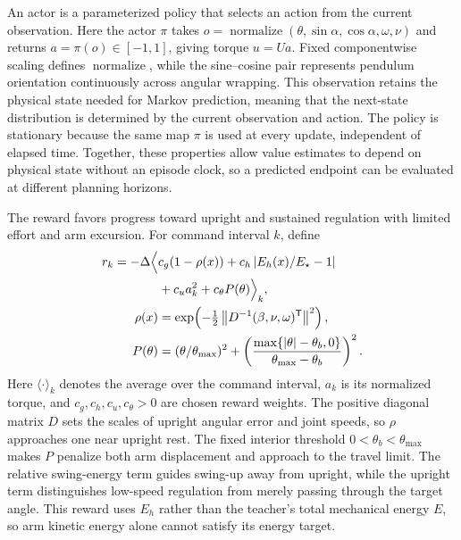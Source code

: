 \documentclass[letterpaper,10pt,conference]{ieeeconf}
\newcommand{\Estar}{E_{\star}}
\begin{document}
An actor is a parameterized policy that selects an action from the current observation. Here the actor $\pi$ takes $o=\operatorname{normalize}(\theta,\sin\alpha,\cos\alpha,\omega,\nu)$ and returns $a=\pi(o)\in[-1,1]$, giving torque $u=Ua$. Fixed componentwise scaling defines $\operatorname{normalize}$, while the sine--cosine pair represents pendulum orientation continuously across angular wrapping. This observation retains the physical state needed for Markov prediction, meaning that the next-state distribution is determined by the current observation and action. The policy is stationary because the same map $\pi$ is used at every update, independent of elapsed time. Together, these properties allow value estimates to depend on physical state without an episode clock, so a predicted endpoint can be evaluated at different planning horizons.

The reward favors progress toward upright and sustained regulation with limited effort and arm excursion. For command interval $k$, define
\begin{equation}
\begin{aligned}
 r_k=-\Delta\Bigl\langle&
 c_g(1-\rho(x))
 +c_h\left|E_h(x)/\Estar-1\right|\\
 &+c_u a_k^2+c_\theta P(\theta)\Bigr\rangle_k,\\
 \rho(x)&=\exp\!\left(-\tfrac12
 \left\|D^{-1}(\beta,\nu,\omega)^{\mathsf T}\right\|^2\right),\\
 P(\theta)&=(\theta/\theta_{\max})^2+
 \left(\frac{\max\{|\theta|-\theta_b,0\}}
 {\theta_{\max}-\theta_b}\right)^2.
\end{aligned}
\label{eq:learning-reward}
\end{equation}
Here $\langle\cdot\rangle_k$ denotes the average over the command interval, $a_k$ is its normalized torque, and $c_g,c_h,c_u,c_\theta>0$ are chosen reward weights. The positive diagonal matrix $D$ sets the scales of upright angular error and joint speeds, so $\rho$ approaches one near upright rest. The fixed interior threshold $0<\theta_b<\theta_{\max}$ makes $P$ penalize both arm displacement and approach to the travel limit. The relative swing-energy term guides swing-up away from upright, while the upright term distinguishes low-speed regulation from merely passing through the target angle. This reward uses $E_h$ rather than the teacher's total mechanical energy $E$, so arm kinetic energy alone cannot satisfy its energy target.
\end{document}
